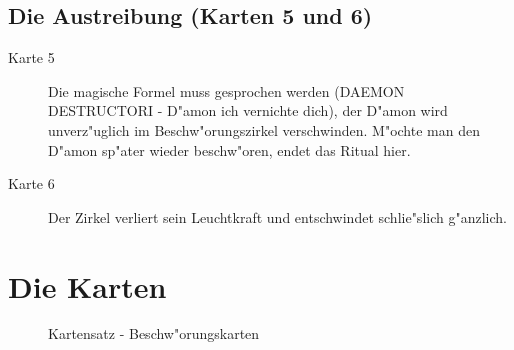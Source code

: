 \subsection{Die Austreibung (Karten 5 und 6)}
\begin{description}
\item [Karte 5] Die magische Formel muss gesprochen werden (DAEMON DESTRUCTORI - D"amon ich vernichte dich), der D"amon wird unverz"uglich im Beschw"orungszirkel verschwinden. M"ochte man den D"amon sp"ater wieder beschw"oren, endet das Ritual hier.
\item [Karte 6] Der Zirkel verliert sein Leuchtkraft und entschwindet schlie"slich g"anzlich.
\end{description}

\newpage
\section{Die Karten}
\begin{figure}[hbtp]
\begin{center}
\end{center}
\caption{Kartensatz - Beschw"orungskarten}
\label{bkarten}
\end{figure}
